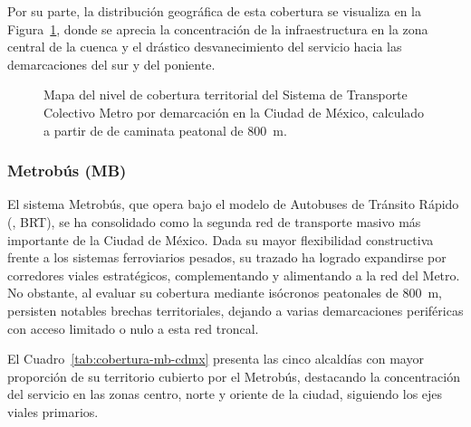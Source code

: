 Por su parte, la distribución geográfica de esta cobertura se visualiza en la
Figura~\ref{fig:mapa-cobertura-metro}, donde se aprecia la concentración de la
infraestructura en la zona central de la cuenca y el drástico desvanecimiento del
servicio hacia las demarcaciones del sur y del poniente.

\begin{figure}[H]
    \centering
    \caption[Mapa de cobertura territorial del STC Metro en la CDMX]{Mapa del
    nivel de cobertura territorial del Sistema de Transporte Colectivo Metro
    por demarcación en la Ciudad de México, calculado a partir de 
    de caminata peatonal de 800~m.}
    \label{fig:mapa-cobertura-metro}
\end{figure}

\subsubsection{Metrobús (MB)}
\label{subsubsec:cobertura-mb}

El sistema Metrobús, que opera bajo el modelo de Autobuses de Tránsito Rápido
(, BRT), se ha consolidado como la segunda red de
transporte masivo más importante de la Ciudad de México. Dada su mayor flexibilidad
constructiva frente a los sistemas ferroviarios pesados, su trazado ha logrado
expandirse por corredores viales estratégicos, complementando y alimentando a la
red del Metro. No obstante, al evaluar su cobertura mediante isócronos peatonales
de 800~m, persisten notables brechas territoriales, dejando a varias demarcaciones
periféricas con acceso limitado o nulo a esta red troncal.

El Cuadro~\ref{tab:cobertura-mb-cdmx} presenta las cinco alcaldías con mayor
proporción de su territorio cubierto por el Metrobús, destacando la concentración
del servicio en las zonas centro, norte y oriente de la ciudad, siguiendo los ejes
viales primarios.

